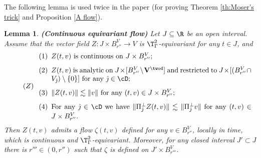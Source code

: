 \documentclass[11pt,a4paper,reqno]{article}
\numberwithin{equation}{section}
\newtheorem{lemma}[theorem]{Lemma}
\theoremstyle{definition}
\begin{document}
\begin{appendix}
        
        The following lemma is used twice in the paper (for proving Theorem \ref{th:Moser's trick} and
        Proposition 
         \ref{A flow}). 
       
        \begin{lemma}\label{lm:B1}
        {\bf (Continuous equivariant flow)}
            Let 
            $J\subseteq\R$ be an open interval. Assume that the vector field  $Z:J\times B_{r''}^V\to V$ is
            $\T^2_\Gamma$-equivariant for any $ t \in J $, and   
            \begin{align}
            \label{list:Properties of Z}\tag{$Z$}
            \begin{minipage}{0.9\linewidth}
            \begin{enumerate}
                \item[(1)] $Z(t,v)$ is continuous on $ J \times B_{r''}^V $;
                \item[(2)] $Z(t,v)$ is analytic on $J\times  [B_{r''}^V\setminus {\bf V}^{\twod}]$
                      and restricted to  $J\times [(B_{r''}^V\cap V_{\hat \jmath})\setminus\{0\}]$ for any ${\hat \jmath} \in \cD $;
                \item[(3)] $\|Z(t,v)\|\lesssim \|v\|$ for any $(t,v)\in J\times B_{r''}^V$;
                \item[(4)] For any ${\hat \jmath}\in\cD$  we have 
                $\|\Pi_{\hat \jmath}^\bot Z(t,v)\|\lesssim 
                {\|\Pi_{\hat \jmath}^\bot v\|} $ for any $(t,v)\in J\times B_{r''}^V$. 
            \end{enumerate}
            \end{minipage}
            \end{align}
        Then $Z(t,v)$ admits a  flow $\zeta(t,v)$ 
            defined for any $ v \in B_{r''}^V $, locally in time,
which is 
continuous and  
            $\T^2_\Gamma$-equivariant.  
            Moreover, for any closed interval $J'\subset J $  there is $ {r'''}\in(0,r'')$ such that $\zeta$ is defined on $J'\times B_{r'''}^V$.          
        \end{lemma}
        

\end{appendix}
\end{document}
